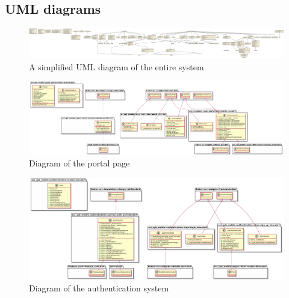 \begin{landscape}
\chapter{UML diagrams} \label{a:uml}
    \begin{figure}[ht]
        \centering
             \includegraphics[width=\linewidth]{figures/uml/system.pdf}
        \caption{A simplified UML diagram of the entire system}
        \label{a:fig:uml}
    \end{figure}
    
    \begin{figure}[ht]
        \centering
             \includegraphics[width=\linewidth]{figures/uml/portal.pdf}
        \caption{Diagram of the portal page}
        \label{a:fig:uml_portal}
    \end{figure}
    
    \begin{figure}[ht]
        \centering
             \includegraphics[width=\linewidth]{figures/uml/authentication.pdf}
        \caption{Diagram of the authentication system}
        \label{a:fig:uml_authentication}
    \end{figure}
\end{landscape}
    
